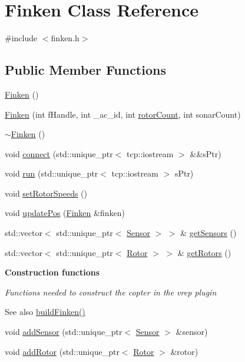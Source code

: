 \hypertarget{classFinken}{}\section{Finken Class Reference}
\label{classFinken}


{\ttfamily \#include $<$finken.\+h$>$}

\subsection*{Public Member Functions}
\begin{DoxyCompactItemize}
\item 
\hyperlink{classFinken_afb256567ee9aa96c409fdb0529b4f228}{Finken} ()
\item 
\hyperlink{classFinken_a26a9cd42385ec3ae010e2ad1387d9ce6}{Finken} (int f\+Handle, int \+\_\+ac\+\_\+id, int \hyperlink{classFinken_a2de6be70e0baaf63641df0214bf1f7a2}{rotor\+Count}, int sonar\+Count)
\item 
\hyperlink{classFinken_a94e6a3b5b14ec7ee351d219eb17be45b}{$\sim$\+Finken} ()
\item 
void \hyperlink{classFinken_aa4779668e3bf85253e371b30e0da808a}{connect} (std\+::unique\+\_\+ptr$<$ tcp\+::iostream $>$ \&\&s\+Ptr)
\item 
void \hyperlink{classFinken_ae3c3abbf571407e210f4b03b68cada9d}{run} (std\+::unique\+\_\+ptr$<$ tcp\+::iostream $>$ s\+Ptr)
\item 
void \hyperlink{classFinken_aaead1098c0752c8ec5b99bccd9945f3b}{set\+Rotor\+Speeds} ()
\item 
void \hyperlink{classFinken_afddc56af42f000ff17c4a00779b4ad6a}{update\+Pos} (\hyperlink{classFinken}{Finken} \&finken)
\item 
std\+::vector$<$ std\+::unique\+\_\+ptr$<$ \hyperlink{classSensor}{Sensor} $>$ $>$ \& \hyperlink{classFinken_a1215883fb6df7c4853e498dec43b4e6a}{get\+Sensors} ()
\item 
std\+::vector$<$ std\+::unique\+\_\+ptr$<$ \hyperlink{classRotor}{Rotor} $>$ $>$ \& \hyperlink{classFinken_a610ce496f1c5f2ca22850ee26c54510c}{get\+Rotors} ()
\end{DoxyCompactItemize}
\begin{Indent}{\bf Construction functions}\par
{\em Functions needed to construct the copter in the vrep plugin \begin{DoxySeeAlso}{See also}
\hyperlink{finken_8cpp_ab8920c514423348469521fe0063534c4}{build\+Finken()} 
\end{DoxySeeAlso}
}\begin{DoxyCompactItemize}
\item 
void \hyperlink{classFinken_a2f2adb211e80a689f580b87730aeb9d1}{add\+Sensor} (std\+::unique\+\_\+ptr$<$ \hyperlink{classSensor}{Sensor} $>$ \&sensor)
\item 
void \hyperlink{classFinken_a4ac9d9b37fba41147a83a36286fbe91b}{add\+Rotor} (std\+::unique\+\_\+ptr$<$ \hyperlink{classRotor}{Rotor} $>$ \&rotor)
\end{DoxyCompactItemize}
\end{Indent}
